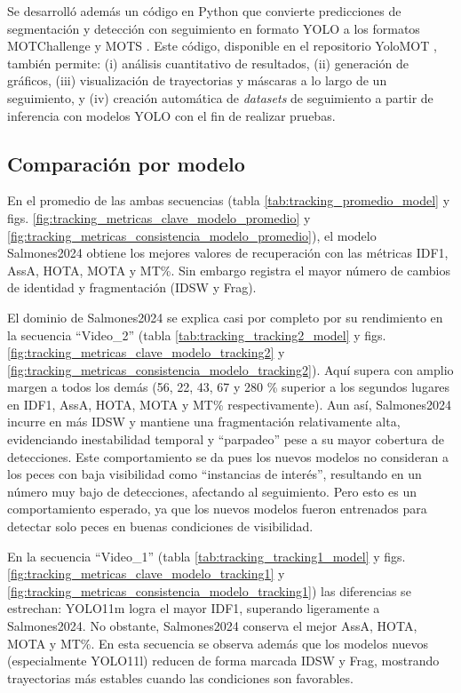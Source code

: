 Se desarrolló además un código en Python que convierte predicciones de segmentación y detección con seguimiento en formato YOLO a los formatos MOTChallenge y MOTS \cite{MOTSChallenge}. Este código, disponible en el repositorio YoloMOT \cite{Lopez2025-YoloMOT}, también permite: (i) análisis cuantitativo de resultados, (ii) generación de gráficos, (iii) visualización de trayectorias y máscaras a lo largo de un seguimiento, y (iv) creación automática de \textit{datasets} de seguimiento a partir de inferencia con modelos YOLO con el fin de realizar pruebas.

\subsection{Comparación por modelo}
En el promedio de las ambas secuencias (tabla \ref{tab:tracking_promedio_model} y figs. \ref{fig:tracking_metricas_clave_modelo_promedio} y \ref{fig:tracking_metricas_consistencia_modelo_promedio}), el modelo Salmones2024 obtiene los mejores valores de recuperación con las métricas IDF1, AssA, HOTA, MOTA y MT\%. Sin embargo registra el mayor número de cambios de identidad y fragmentación (IDSW y Frag).

El dominio de Salmones2024 se explica casi por completo por su rendimiento en la secuencia ``Video\_2'' (tabla \ref{tab:tracking_tracking2_model} y figs. \ref{fig:tracking_metricas_clave_modelo_tracking2} y \ref{fig:tracking_metricas_consistencia_modelo_tracking2}). Aquí supera con amplio margen a todos los demás (56, 22, 43, 67 y 280 \% superior a los segundos lugares en IDF1, AssA, HOTA, MOTA y MT\% respectivamente). Aun así, Salmones2024 incurre en más IDSW y mantiene una fragmentación relativamente alta, evidenciando inestabilidad temporal y ``parpadeo'' pese a su mayor cobertura de detecciones. Este comportamiento se da pues los nuevos modelos no consideran a los peces con baja visibilidad como ``instancias de interés'', resultando en un número muy bajo de detecciones, afectando al seguimiento. Pero esto es un comportamiento esperado, ya que los nuevos modelos fueron entrenados para detectar solo peces en buenas condiciones de visibilidad.

En la secuencia ``Video\_1'' (tabla \ref{tab:tracking_tracking1_model} y figs. \ref{fig:tracking_metricas_clave_modelo_tracking1} y \ref{fig:tracking_metricas_consistencia_modelo_tracking1}) las diferencias se estrechan: YOLO11m logra el mayor IDF1, superando ligeramente a Salmones2024. No obstante, Salmones2024 conserva el mejor AssA, HOTA, MOTA y MT\%. En esta secuencia se observa además que los modelos nuevos (especialmente YOLO11l) reducen de forma marcada IDSW y Frag, mostrando trayectorias más estables cuando las condiciones son favorables.


